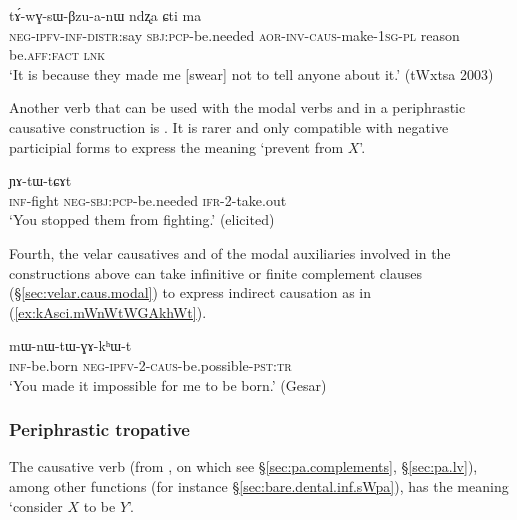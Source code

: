  \begin{exe}
\ex  \label{ex:kWra.tAwGsWBzuanW}
\gll [mɯ-tu-kɤ-nɤtɯti kɯ-ra] tɤ́-wɣ-sɯ-βzu-a-nɯ ndʐa ɕti ma  \\
\textsc{neg}-\textsc{ipfv}-\textsc{inf}-\textsc{distr}:say \textsc{sbj}:\textsc{pcp}-be.needed \textsc{aor}-\textsc{inv}-\textsc{caus}-make-\textsc{1sg}-\textsc{pl} reason be.\textsc{aff}:\textsc{fact} \textsc{lnk} \\ 
\glt `It is because they made me [swear] not to tell anyone about it.'  (tWxtsa 2003)
\end{exe}

Another verb that can be used with the modal verbs  and  in a periphrastic causative construction is . It is rarer and only compatible with negative participial forms to express the meaning `prevent from $X$'.

\begin{exe}
\ex  \label{ex:mAkWra.YAtWtCAt}
\gll  [kɤ-ɤlɯlɤt mɤ-kɯ-ra] ɲɤ-tɯ-tɕɤt \\
\textsc{inf}-fight \textsc{neg}-\textsc{sbj}:\textsc{pcp}-be.needed \textsc{ifr}-2-take.out \\
\glt `You stopped them from fighting.' (elicited)
\end{exe}

 
Fourth, the velar causatives   and   of the modal auxiliaries involved in the constructions above can take infinitive or finite complement clauses (§\ref{sec:velar.caus.modal}) to express indirect causation as in (\ref{ex:kAsci.mWnWtWGAkhWt}).

\begin{exe}
\ex \label{ex:kAsci.mWnWtWGAkhWt}
\gll   [kɤ-sci] mɯ-nɯ-tɯ-ɣɤ-kʰɯ-t  \\
\textsc{inf}-be.born \textsc{neg}-\textsc{ipfv}-2-\textsc{caus}-be.possible-\textsc{pst}:\textsc{tr} \\
\glt `You made it impossible for me to be born.' (Gesar)
\end{exe}  

\subsubsection{Periphrastic tropative} \label{sec:tropative.sWpa}
The causative verb  (from , on which see
§\ref{sec:pa.complements}, §\ref{sec:pa.lv}), among other functions (for instance §\ref{sec:bare.dental.inf.sWpa}), has the meaning `consider $X$ to be $Y$'.

